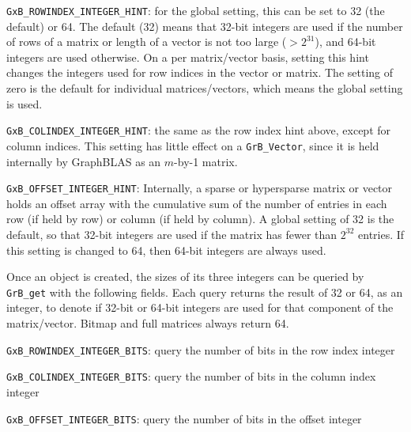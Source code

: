 \begin{packed_itemize}
\item \verb'GxB_ROWINDEX_INTEGER_HINT': for the global setting, this can be
set to 32 (the default) or 64.  The default (32) means that 32-bit integers are
used if the number of rows of a matrix or length of a vector is not too
large ($>2^{31}$), and 64-bit integers are used otherwise.  On a per
matrix/vector basis, setting this hint changes the integers used for row
indices in the vector or matrix.  The setting of zero is the default for
individual matrices/vectors, which means the global setting is used.
\item \verb'GxB_COLINDEX_INTEGER_HINT':  the same as the row index hint above,
except for column indices.  This setting has little effect on a
\verb'GrB_Vector', since it is held internally by GraphBLAS as an $m$-by-1
matrix.
\item \verb'GxB_OFFSET_INTEGER_HINT':  Internally, a sparse or hypersparse
matrix or vector holds an offset array with the cumulative sum of the number of
entries in each row (if held by row) or column (if held by column).  A global
setting of 32 is the default, so that 32-bit integers are used if the matrix
has fewer than $2^{32}$ entries. If this setting is changed to 64, then 64-bit
integers are always used.
\end{packed_itemize}

Once an object is created, the sizes of its three integers can be
queried by \verb'GrB_get' with the following fields.  Each query returns the
result of 32 or 64, as an integer, to denote if 32-bit or 64-bit integers are
used for that component of the matrix/vector.  Bitmap and full matrices always
return 64.

\begin{packed_itemize}
\item \verb'GxB_ROWINDEX_INTEGER_BITS': query the number of bits in the row index integer
\item \verb'GxB_COLINDEX_INTEGER_BITS': query the number of bits in the column index integer
\item \verb'GxB_OFFSET_INTEGER_BITS': query the number of bits in the offset integer
\end{packed_itemize}


